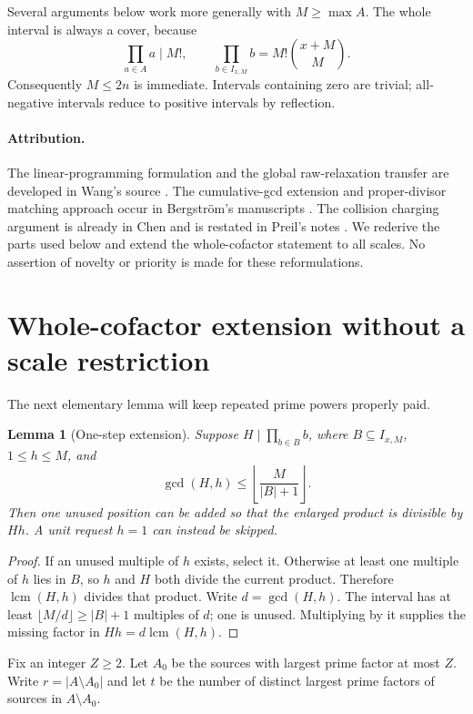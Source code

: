 \documentclass[11pt,a4paper]{article}
\newtheorem{lemma}[theorem]{Lemma}
\theoremstyle{remark}
\DeclareMathOperator{\lcm}{lcm}
\newcommand{\II}{I_{x,M}}
\begin{document}
Several arguments below work more generally with $M\ge\max A$.
The whole interval is always a cover, because
\[
 \prod_{a\in A}a\mid M!,\qquad
 \prod_{b\in\II}b=M!\binom{x+M}{M}.
\]
Consequently $M\le2n$ is immediate. Intervals containing zero are trivial;
all-negative intervals reduce to positive intervals by reflection.

\paragraph{Attribution.}
The linear-programming formulation and the global raw-relaxation transfer
are developed in Wang's source \cite{wang}. The cumulative-gcd extension
and proper-divisor matching approach occur in Bergstr\"om's manuscripts
\cite{berg-asym,berg-hinge}. The collision charging argument is already in
Chen and is restated in Preil's notes \cite{chen,preil}. We rederive the
parts used below and extend the whole-cofactor statement to all scales.
No assertion of novelty or priority is made for these reformulations.

\section{Whole-cofactor extension without a scale restriction}
The next elementary lemma will keep repeated prime powers properly paid.

\begin{lemma}[One-step extension]\label{lem:extension}
Suppose $H\mid\prod_{b\in B}b$, where $B\subseteq\II$,
$1\le h\le M$, and
\[
 \gcd(H,h)\le\left\lfloor\frac{M}{|B|+1}\right\rfloor.
\]
Then one unused position can be added so that the enlarged product is
divisible by $Hh$. A unit request $h=1$ can instead be skipped.
\end{lemma}
\begin{proof}
If an unused multiple of $h$ exists, select it. Otherwise at least one
multiple of $h$ lies in $B$, so $h$ and $H$ both divide the current product.
Therefore $\lcm(H,h)$ divides that product. Write $d=\gcd(H,h)$.
The interval has at least $\lfloor M/d\rfloor\ge |B|+1$ multiples of $d$;
one is unused. Multiplying by it supplies the missing factor in
$Hh=d\lcm(H,h)$.
\end{proof}

Fix an integer $Z\ge2$. Let $A_0$ be the sources with largest prime factor
at most $Z$. Write $r=|A\setminus A_0|$ and let $t$ be the number of
distinct largest prime factors of sources in $A\setminus A_0$.
\end{document}
